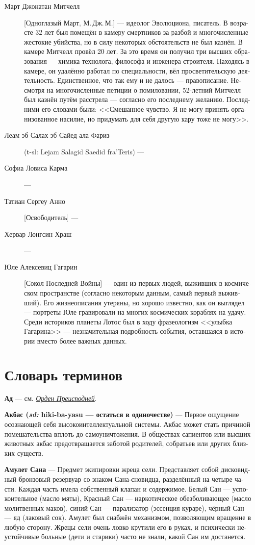 \documentclass[a4paper,12pt,fleqn]{book}\usepackage{polyglossia}\setdefaultlanguage[babelshorthands=true]{russian}\setotherlanguage{english}\defaultfontfeatures{Ligatures=TeX,Mapping=tex-text}\usepackage{xcolor}\newcommand{\ml}[3]{#2}
\newcommand{\theterm}[3]{\textbf{\hypertarget{#1}{#2}} --- #3}
\newcommand{\thesynonim}[3]{\textbf{#2} --- см. \textit{\hyperlink{#1}{#3}}.}
\newcommand{\theorigin}[3]{\textit{#1:} #2 --- #3}
\begin{document}
{\begin{description}
\item[Март Джонатан Митчелл] [Одноглазый Март, М.\,Дж.\,М.] --- идеолог Эволюциона, писатель.
В возрасте 32 лет был помещён в камеру смертников за разбой и многочисленные жестокие убийства, но в силу некоторых обстоятельств не был казнён.
В камере Митчелл провёл 20 лет.
За это время он получил три высших образования --- химика-технолога, философа и инженера-строителя.
Находясь в камере, он удалённо работал по специальности, вёл просветительскую деятельность.
Единственное, что так ему и не далось --- правописание.
Несмотря на многочисленные петиции о помиловании, 52-летний Митчелл был казнён путём расстрела --- согласно его последнему желанию.
Последними его словами были: <<Смешанное чувство.
Я не могу принять организованное насилие, но придумать для себя другую кару тоже не могу>>.

\item[Леам эб-Салах эб-Сайед ала-Фариз] (t-sl: Lejam Salagid Saedid fra'Teris) ---

\item[Софиа Ловиса Карма] ---
\item[Татиан Сергеу Анно] [Освободитель] ---
\item[Хервар Лонгсин-Храш] ---
\item[Юле Алексевиц Гагарин] [Сокол Последней Войны] --- один из первых людей, выживших в космическом пространстве (согласно некоторым данным, самый первый выживший).
Его жизнеописания утеряны, но хорошо известно, как он выглядел --- портреты Юле гравировали на многих космических кораблях на удачу.
Среди историков планеты Лотос был в ходу фразеологизм <<улыбка Гагарина>> --- незначительная подробность события, оставшаяся в истории вместо более важных данных.
\end{description}

\chapter{Словарь терминов}

\thesynonim{order-of-netherworld}
{Ад}
{Орден Преисподней}

\theterm{jacbas} %
{Акбас (\theorigin{sd}{hiki-ba-yasu}{остаться в одиночестве})}
{Первое ощущение осознающей себя высокоинтеллектуальной системы.
Акбас может стать причиной помешательства вплоть до самоуничтожения.
В обществах сапиентов или высших животных акбас предотвращается заботой родителей, собратьев или других близких существ.}

\theterm{amulet-of-san}
{Амулет Сана}
{Предмет экипировки жреца сели.
Представляет собой дисковидный бронзовый резервуар со знаком Сана-сновидца, разделённый на четыре части.
Каждая часть имела собственный клапан и содержимое.
Белый Сан --- успокоительное (масло мяты), Красный Сан --- наркотическое обезболивающее (масло молитвенных маков), синий Сан --- парализатор (эссенция кураре), чёрный Сан --- яд (лаковый сок).
Амулет был снабжён механизмом, позволяющим вращение в любую сторону.
Жрецы сели очень ловко крутили его в руках, и психически неустойчивые больные (дети и старики) часто не знали, какой Сан им достанется.}

}
\end{document}
